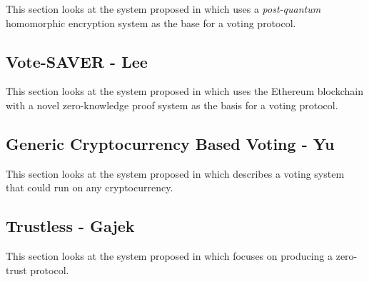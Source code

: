 This section looks at the system proposed in \cite{chillottiHomomorphicLWEBased} which uses a \emph{post-quantum} homomorphic encryption system as the base for a voting protocol.


\subsection{Vote-SAVER - Lee}

This section looks at the system proposed in \cite{leeSAVERSNARKfriendlyAdditivelyhomomorphic2019} which uses the Ethereum blockchain with a novel zero-knowledge proof system as the basis for a voting protocol.


\subsection{Generic Cryptocurrency Based Voting - Yu}

This section looks at the system proposed in \cite{yuPlatformindependentSecureBlockchainBased2018} which describes a voting system that could run on any cryptocurrency.


\subsection{Trustless - Gajek}

This section looks at the system proposed in \cite{gajekTrustlessCensorshipResilientScalable2019} which focuses on producing a zero-trust protocol.


\newcommand*\YES{}
\newcommand*\NO{}

\newcommand*\NP{$n$}
\newcommand*\ALL{$Y$}
\newcommand*\SERVER{$Y_s$}
\newcommand*\REG{$Y_r$}
\newcommand*\SERVERREG{$Y_{rs}$}
\newcommand*\AUTH{$Y_a$}


